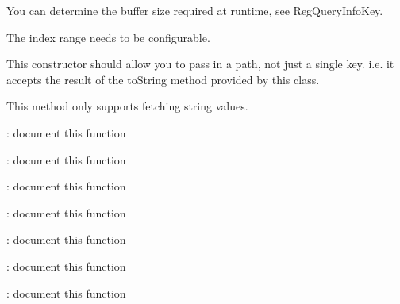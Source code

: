 \begin{DoxyRefList}
You can determine the buffer size required at runtime, see Reg\+Query\+Info\+Key.  
\item[\label{todo__todo000007}%
\hypertarget{todo__todo000007}{}%
Member \hyperlink{class_image_entry_acd053af5a4af1443443e3863f1df9b37}{Image\+Entry\+:\+:is\+Valid} ()]The index range needs to be configurable.  
\item[\label{todo__todo000001}%
\hypertarget{todo__todo000001}{}%
Member \hyperlink{class_key_path_ae333110e571e2126ce2e9a19f4900ab7}{Key\+Path\+:\+:Key\+Path} (std\+::string key\+\_\+name)]This constructor should allow you to pass in a path, not just a single key. i.\+e. it accepts the result of the to\+String method provided by this class.  
\item[\label{todo__todo000006}%
\hypertarget{todo__todo000006}{}%
Member \hyperlink{class_simple_registry_access_accef2c679695c6e05a9e7c1c2a962481}{Simple\+Registry\+Access\+:\+:get\+Value\+At\+Path} (\hyperlink{class_key_path}{Key\+Path} key\+\_\+path, std\+::string value\+\_\+name)]This method only supports fetching string values.  
\item[\label{todo__todo000008}%
\hypertarget{todo__todo000008}{}%
Member \hyperlink{class_test_framework_a4f37e58d8b67f9da66372cf43f4281ae}{Test\+Framework\+:\+:add\+Test} (std\+::function$<$ bool(void)$>$ test\+Function)]\+: document this function  
\item[\label{todo__todo000009}%
\hypertarget{todo__todo000009}{}%
Member \hyperlink{class_test_framework_ace2588c0b0043546abc584b1d1b08e96}{Test\+Framework\+:\+:execute} ()]\+: document this function  
\item[\label{todo__todo000010}%
\hypertarget{todo__todo000010}{}%
Member \hyperlink{class_test_framework_ae12aac94ee9a745eb3ce46f5d003dcf2}{Test\+Framework\+:\+:get\+Tests\+Status} ()]\+: document this function  
\item[\label{todo__todo000011}%
\hypertarget{todo__todo000011}{}%
Member \hyperlink{class_test_framework_ad35b7b750378155531cf65e8163b67dd}{Test\+Framework\+:\+:get\+Total\+Tests\+Run} ()]\+: document this function  
\item[\label{todo__todo000012}%
\hypertarget{todo__todo000012}{}%
Member \hyperlink{class_test_framework_a34508c693cf7a3be01a3975065fa2457}{Test\+Framework\+:\+:get\+Total\+Tests\+Run\+Successfully} ()]\+: document this function  
\item[\label{todo__todo000013}%
\hypertarget{todo__todo000013}{}%
Member \hyperlink{class_test_framework_a80e30a085718a9e3db4e6f4e79cc9d48}{Test\+Framework\+:\+:Test\+Framework} ()]\+: document this function  
\item[\label{todo__todo000014}%
\hypertarget{todo__todo000014}{}%
Member \hyperlink{class_test_framework_aad3d6888fe40a083e767061a1ebf0c1d}{Test\+Framework\+:\+:$\sim$\+Test\+Framework} ()]\+: document this function 
\end{DoxyRefList}
